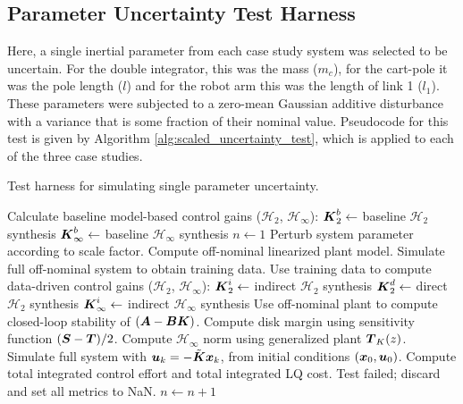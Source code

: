 \newpage
\subsection{Parameter Uncertainty Test Harness}
Here, a single inertial parameter from each case study system was selected to be uncertain.  For the double integrator, this was the mass ($m_{c}$), for the cart-pole it was the pole length ($l$) and for the robot arm this was the length of link 1 ($l_{1}$).  These parameters were subjected to a zero-mean Gaussian additive disturbance with a variance that is some fraction of their nominal value.  Pseudocode for this test is given by Algorithm \ref{alg:scaled_uncertainty_test}, which is applied to each of the three case studies.

\begin{algorithm}
\caption{Test harness for simulating single parameter uncertainty.}
\label{alg:scaled_uncertainty_test}
\begin{algorithmic}
	\State Calculate baseline model-based control gains ($\mathcal{H}_{2}$, $\mathcal{H}_{\infty}$):
	\State \hspace{10pt} $\vb*{K}_{2}^{b} \gets $ baseline $\mathcal{H}_{2}$ synthesis
	\State \hspace{10pt} $\vb*{K}_{\infty}^{b} \gets $ baseline $\mathcal{H}_{\infty}$ synthesis
		\State $n \gets 1$
			\State Perturb system parameter according to scale factor.
			\State Compute off-nominal linearized plant model.
			\State Simulate full off-nominal system to obtain training data.
			\State Use training data to compute data-driven control gains ($\mathcal{H}_{2}$, $\mathcal{H}_{\infty}$):
			\State \hspace{10pt} $\vb*{K}_{2}^{i} \gets $ indirect $\mathcal{H}_{2}$ synthesis
			\State \hspace{10pt} $\vb*{K}_{2}^{d} \gets $ direct $\mathcal{H}_{2}$ synthesis
			\State \hspace{10pt} $\vb*{K}_{\infty}^{i} \gets $ indirect $\mathcal{H}_{\infty}$ synthesis
				\State Use off-nominal plant to compute closed-loop stability of $(\vb*{A} - \vb*{B}\vb*{K})$.
					\State Compute disk margin using sensitivity function $(\vb*{S} - \vb*{T})/2$.
					\State Compute $\mathcal{H}_{\infty}$ norm using generalized plant $\vb*{T}_{K}(z)$.
					\State Simulate full system with $\vb*{u}_{k} = -\tilde{\vb*{K}}\vb*{x}_{k}$, from initial conditions $(\vb*{x}_{0},\vb*{u}_{0})$.
					\State Compute total integrated control effort and total integrated LQ cost.
				\Else
					\State Test failed; discard and set all metrics to NaN.
				\EndIf
			\EndFor
		\State $n \gets n + 1$
		\EndWhile
	\EndFor
\end{algorithmic}
\end{algorithm}

